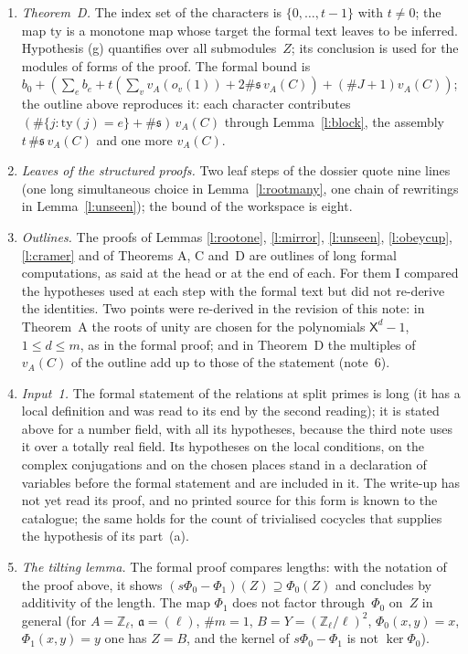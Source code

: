 \documentclass[11pt,a4paper]{article}
\newcommand{\m}[1]{\mbox{$#1$}}        %
\theoremstyle{plainx}
\theoremstyle{uprightx}
\newcommand{\Zl}{\mathbb{Z}_\ell}
\begin{document}
\begin{enumerate}[label=\textup{\arabic*.},leftmargin=1.6em,itemsep=5pt]
non-negative reals, $c$ and $\mathsf{h}$ non-negative reals.
\item \emph{Theorem~D.} The index set of the characters is \m{\{0,\dots,t-1\}} with \m{t\ne0}; the map
\m{\mathrm{ty}} is a monotone map whose target the formal text leaves to be inferred. Hypothesis (g) quantifies
over all submodules~$Z$; its conclusion is used for the modules of forms of the proof. The formal bound is
\m{b_0+(\sum_eb_e+t(\sum_vv_A(o_v(1))+2\#\mathfrak{s}\,v_A(C))+(\#J+1)v_A(C))}; the outline above reproduces it: each
character contributes \m{(\#\{j:\mathrm{ty}(j)=e\}+\#\mathfrak{s})\,v_A(C)} through Lemma~\ref{l:block}, the assembly
\m{t\,\#\mathfrak{s}\,v_A(C)} and one more \m{v_A(C)}.
\item \emph{Leaves of the structured proofs.} Two leaf steps of the dossier quote nine lines (one long
simultaneous choice in Lemma~\ref{l:rootmany}, one chain of rewritings in Lemma~\ref{l:unseen}); the bound of the
workspace is eight.
\item \emph{Outlines.} The proofs of Lemmas \ref{l:rootone}, \ref{l:mirror}, \ref{l:unseen}, \ref{l:obeycup},
\ref{l:cramer} and of Theorems A, C and~D are outlines of long formal computations, as said at the head or at
the end of each. For them I compared the hypotheses used at each step with the formal text but did not re-derive
the identities. Two points were re-derived in the revision of this note: in Theorem~A the roots of unity are
chosen for the polynomials \m{\mathsf{X}^{d}-1}, \m{1\le d\le m}, as in the formal proof; and in Theorem~D the multiples of
\m{v_A(C)} of the outline add up to those of the statement (note~6).
\item \emph{Input~1.} The formal statement of the relations at split primes is long (it has a local definition
and was read to its end by the second reading); it is stated above for a number field, with all its hypotheses,
because the third note uses it over a totally real field. Its hypotheses on the local conditions, on the complex
conjugations and on the chosen places stand in a declaration of variables before the formal statement and are
included in it. The write-up has not yet read its proof, and no printed source for this form is known to the
catalogue; the same holds for the count of trivialised cocycles that supplies the hypothesis of its part~(a).
\item \emph{The tilting lemma.} The formal proof compares lengths: with the notation of the proof above, it shows
\m{(s\Phi_0-\Phi_1)(Z)\supseteq\Phi_0(Z)} and concludes by additivity of the length. The map $\Phi_1$ does not factor
through~$\Phi_0$ on~$Z$ in general (for \m{A=\Zl}, \m{\mathfrak{a}=(\ell)}, \m{\#m=1}, \m{B=Y=(\Zl/\ell)^2},
\m{\Phi_0(x,y)=x}, \m{\Phi_1(x,y)=y} one has \m{Z=B}, and the kernel of \m{s\Phi_0-\Phi_1} is not \m{\ker\Phi_0}).
\end{enumerate}
\end{document}
